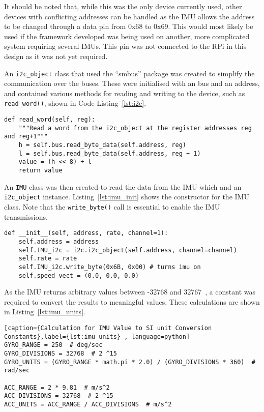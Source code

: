 It should be noted that, while this was the only \isc{} device currently
used, other devices with conflicting addresses can be handled as the IMU
allows the address to be changed through a data pin from 0x68 to 0x69.
This would most likely be used if the framework developed was being used
on another, more complicated system requiring several IMUs. This pin was
not connected to the RPi in this design as it was not yet required.

An \verb|i2c_object| class that used the ``smbus'' package was created to
simplify the communication over the \isc{} buses. These
were initialised with an \isc{} bus and an address, and
contained various methods for reading and writing to the \isc{} device,
such as \verb|read_word()|, shown in Code Listing~\ref{lst:i2c}.

\begin{lstlisting}[caption={I2C \texttt{read\_word()} function}, label={lst:i2c}]
def read_word(self, reg):
    """Read a word from the i2c_object at the register addresses reg and reg+1"""
    h = self.bus.read_byte_data(self.address, reg)
    l = self.bus.read_byte_data(self.address, reg + 1)
    value = (h << 8) + l
    return value
\end{lstlisting}

An \verb|IMU| class was then created to read the data from the IMU which
and an \verb|i2c_object| instance. Listing~\ref{lst:imu_init} shows
the constructor for the IMU class. Note that the \verb|write_byte()| call
is essential to enable the IMU transmissions.

\begin{lstlisting}[caption={IMU Initialisation Function}, label={lst:imu_init}]
def __init__(self, address, rate, channel=1):
    self.address = address
    self.IMU_i2c = i2c.i2c_object(self.address, channel=channel)
    self.rate = rate
    self.IMU_i2c.write_byte(0x6B, 0x00) # turns imu on
    self.speed_vect = (0.0, 0.0, 0.0)
\end{lstlisting}

As the IMU returns arbitrary values between -32768 and 32767~\cite{MPU6050Datasheet},
a constant was required to convert the results to meaningful values. These calculations are shown in Listing~\ref{lst:imu_units}.

\begin{lstlisting}[caption={Calculation for IMU Value to SI unit Conversion Constants},label={lst:imu_units} , language=python]
GYRO_RANGE = 250  # deg/sec
GYRO_DIVISIONS = 32768  # 2 ^15
GYRO_UNITS = (GYRO_RANGE * math.pi * 2.0) / (GYRO_DIVISIONS * 360)  # rad/sec

ACC_RANGE = 2 * 9.81  # m/s^2
ACC_DIVISIONS = 32768  # 2 ^15
ACC_UNITS = ACC_RANGE / ACC_DIVISIONS  # m/s^2
\end{lstlisting}

